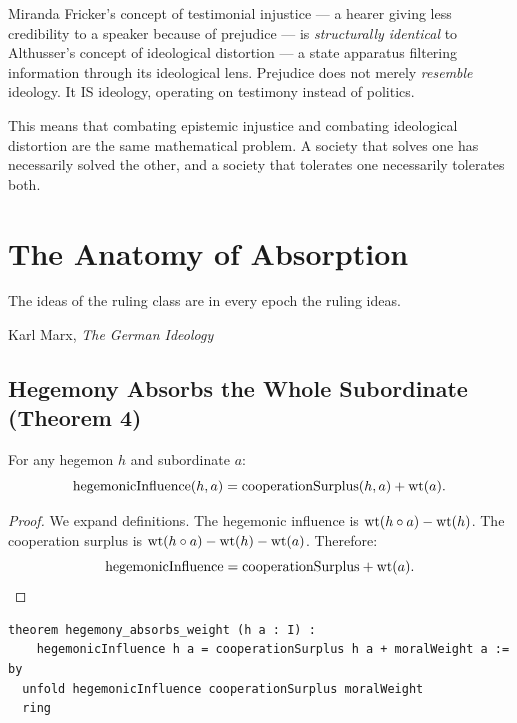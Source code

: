 \begin{interpretation}
Miranda Fricker's concept of testimonial injustice --- a hearer giving less credibility to a speaker because of prejudice --- is \emph{structurally identical} to Althusser's concept of ideological distortion --- a state apparatus filtering information through its ideological lens.  Prejudice does not merely \emph{resemble} ideology.  It IS ideology, operating on testimony instead of politics.

This means that combating epistemic injustice and combating ideological distortion are the same mathematical problem.  A society that solves one has necessarily solved the other, and a society that tolerates one necessarily tolerates both.
\end{interpretation}


\chapter{The Anatomy of Absorption}

\epigraph{The ideas of the ruling class are in every epoch the ruling ideas.}{Karl Marx, \textit{The German Ideology}}

\section{Hegemony Absorbs the Whole Subordinate (Theorem 4)}

\begin{theorem}
\label{thm:absorption}
For any hegemon $h$ and subordinate $a$:
\[
\text{hegemonicInfluence}(h, a) = \text{cooperationSurplus}(h, a) + \operatorname{wt}(a).
\]
\end{theorem}

\begin{proof}
We expand definitions.  The hegemonic influence is $\operatorname{wt}(h \circ a) - \operatorname{wt}(h)$.  The cooperation surplus is $\operatorname{wt}(h \circ a) - \operatorname{wt}(h) - \operatorname{wt}(a)$.  Therefore:
\[
\text{hegemonicInfluence} = \text{cooperationSurplus} + \operatorname{wt}(a). \qedhere
\]
\end{proof}

\begin{lstlisting}
theorem hegemony_absorbs_weight (h a : I) :
    hegemonicInfluence h a = cooperationSurplus h a + moralWeight a := by
  unfold hegemonicInfluence cooperationSurplus moralWeight
  ring
\end{lstlisting}

